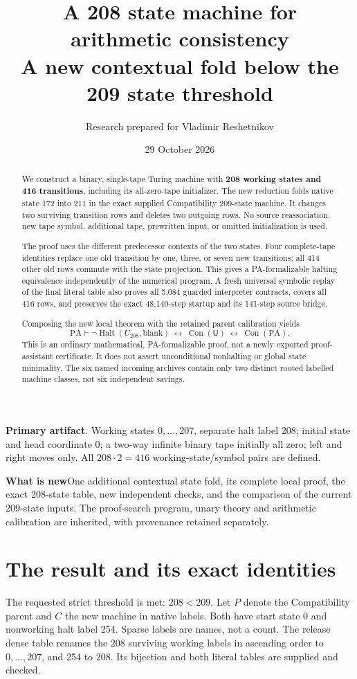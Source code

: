 \documentclass[11pt,letterpaper]{article}
\title{\vspace{-1cm}\textbf{A 208 state machine for\\arithmetic consistency}\\[6pt]\large A new contextual fold below the 209 state threshold}
\author{Research prepared for Vladimir Reshetnikov}\date{29 October 2026}
\newcommand{\PA}{\mathrm{PA}}\newcommand{\UU}{\mathsf U}
\newcommand{\Con}{\operatorname{Con}}\newcommand{\Halt}{\operatorname{Halt}}
\begin{document}
\maketitle\thispagestyle{empty}
\begin{abstract}
We construct a binary, single-tape Turing machine with \textbf{208 working
states and 416 transitions}, including its all-zero-tape initializer.
The new reduction folds native state 172 into 211 in the exact supplied
Compatibility 209-state machine. It changes two surviving transition rows
and deletes two outgoing rows. No source reassociation, new tape symbol,
additional tape, prewritten input, or omitted initialization is used.

The proof uses the different predecessor contexts of the two states.
Four complete-tape identities replace one old transition by one, three,
or seven new transitions; all 414 other old rows commute with the state
projection. This gives a PA-formalizable halting equivalence independently
of the numerical program. A fresh universal symbolic replay of the final
literal table also proves all 5,084 guarded interpreter contracts, covers
all 416 rows, and preserves the exact 48,140-step startup and its 141-step
source bridge.

Composing the new local theorem with the retained parent calibration yields
\[
 \PA\vdash\neg\Halt(U_{208},\mathrm{blank})
 \ \longleftrightarrow\ \Con(\UU)
 \ \longleftrightarrow\ \Con(\PA).
\]
This is an ordinary mathematical, PA-formalizable proof, not a newly
exported proof-assistant certificate. It does not assert unconditional
nonhalting or global state minimality. The six named incoming archives
contain only two distinct rooted labelled machine classes, not six
independent savings.
\end{abstract}
\vspace{3pt}
\textbf{Primary artifact}\quad{}. Working states
$0,\ldots,207$, separate halt label 208; initial state and head coordinate
0; a two-way infinite binary tape initially all zero; left and right
moves only. All $208\cdot2=416$ working-state/symbol pairs are defined.

\textbf{What is new}\quad One additional contextual state fold, its complete
local proof, the exact 208-state table, new independent checks, and the
comparison of the current 209-state inputs. The proof-search program,
unary theory and arithmetic calibration are inherited, with provenance
retained separately.

\section{The result and its exact identities}
The requested strict threshold is met: $208<209$. Let $P$ denote the
Compatibility parent and $C$ the new machine in native labels.
Both have start state 0 and nonworking halt label 254. Sparse labels are
names, not a count. The release dense table renames the 208 surviving
working labels in ascending order to $0,\ldots,207$, and 254 to 208.
Its bijection and both literal tables are supplied and checked.
\end{document}
